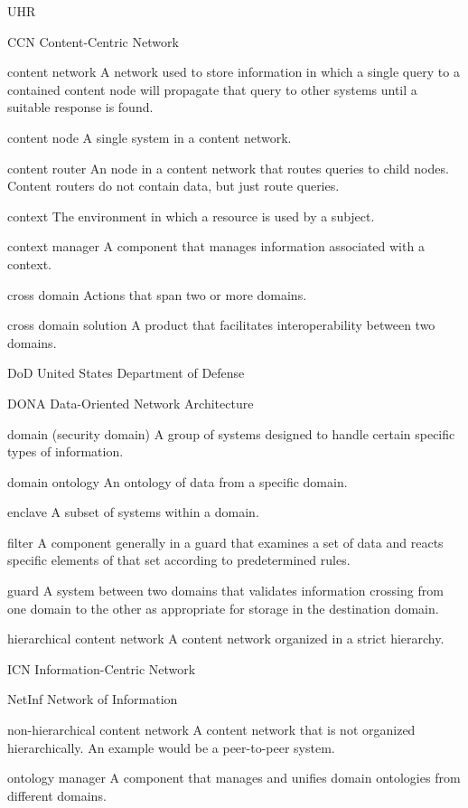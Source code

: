 \documentclass[botnum,fleqn,final]{unmeethesis}
\begin{document}
\begin{glossary}{UHR}
\item[CCN] Content-Centric Network
\item[content network] A network used to store information in which a single query to a contained content node will propagate that query to other systems until a suitable response is found.
\item[content node] A single system in a content network.
\item[content router] An node in a content network that routes queries to child nodes.  Content routers do not contain data, but just route queries.
\item[context] The environment in which a resource is used by a subject.
\item[context manager] A component that manages information associated with a context.
\item[cross domain] Actions that span two or more domains.
\item[cross domain solution] A product that facilitates interoperability between two domains.
\item[DoD] United States Department of Defense
\item[DONA] Data-Oriented Network Architecture
\item[domain (security domain)] A group of systems designed to handle certain specific types of information.
\item[domain ontology] An ontology of data from a specific domain.
\item[enclave] A subset of systems within a domain.
\item[filter] A component generally in a guard that examines a set of data and reacts specific elements of that set according to predetermined rules.
\item[guard] A system between two domains that validates information crossing from one domain to the other as appropriate for storage in the destination domain.
\item[hierarchical content network] A content network organized in a strict hierarchy.
\item[ICN] Information-Centric Network
\item[NetInf] Network of Information
\item[non-hierarchical content network] A content network that is not organized hierarchically.  An example would be a peer-to-peer system.
\item[ontology manager] A component that manages and unifies domain ontologies from different domains.

\end{glossary}
\end{document}
